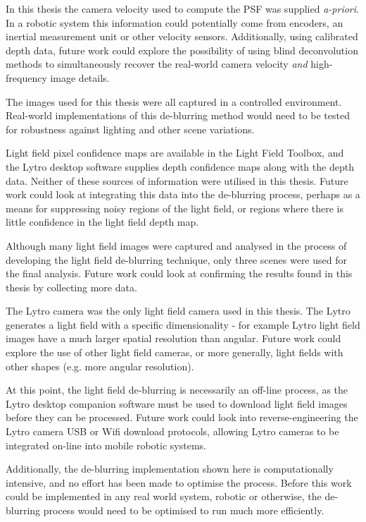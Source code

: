 In this thesis the camera velocity used to compute the PSF was supplied \emph{a-priori}.
In a robotic system this information could potentially come from encoders, an inertial measurement unit or other velocity sensors.
Additionally, using calibrated depth data, future work could explore the possibility of using blind deconvolution methods to simultaneously recover the real-world camera velocity \emph{and} high-frequency image details.

The images used for this thesis were all captured in a controlled environment.
Real-world implementations of this de-blurring method would need to be tested for robustness against lighting and other scene variations.

Light field pixel confidence maps are available in the Light Field Toolbox, and the Lytro desktop software supplies depth confidence maps along with the depth data.
Neither of these sources of information were utilised in this thesis.
Future work could look at integrating this data into the de-blurring process, perhaps as a means for suppressing noisy regions of the light field, or regions where there is little confidence in the light field depth map.

Although many light field images were captured and analysed in the process of developing the light field de-blurring technique, only three scenes were used for the final analysis.
Future work could look at confirming the results found in this thesis by collecting more data.

The Lytro camera was the only light field camera used in this thesis.
The Lytro generates a light field with a specific dimensionality - for example Lytro light field images have a much larger spatial resolution than angular.
Future work could explore the use of other light field cameras, or more generally, light fields with other shapes (e.g. more angular resolution).

At this point, the light field de-blurring is necessarily an off-line process, as the Lytro desktop companion software must be used to download light field images before they can be processed.
Future work could look into reverse-engineering the Lytro camera USB or Wifi download protocols, allowing Lytro cameras to be integrated on-line into mobile robotic systems. 

Additionally, the de-blurring implementation shown here is computationally intensive, and no effort has been made to optimise the process.
Before this work could be implemented in any real world system, robotic or otherwise, the de-blurring process would need to be optimised to run much more efficiently.

